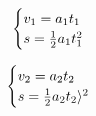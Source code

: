\begin{equation} \begin{cases}v_{1}=a_1 t_{1}\\ s=\frac{1}{2}a_{1} t_{1}^{2}\\ \end{cases}\ \\  \end{equation}

\begin{equation} \begin{cases}v_{2}=a_2 t_{2}\\ s=\frac{1}{2}a_{2} t_{2}\rangle^{2}\\ \end{cases}\ \\  \end{equation}